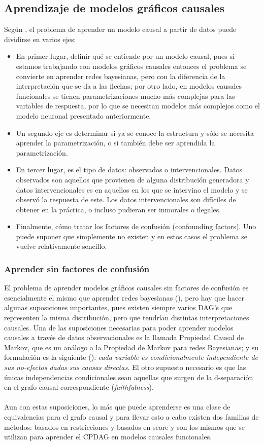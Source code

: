 \documentclass[11pt]{article}
\theoremstyle{plain}
\begin{document}
\subsection{Aprendizaje de modelos gráficos causales}
Según \cite{koller2009probabilistic}, el problema de aprender un modelo causal a partir de datos puede dividirse en varios ejes:
\begin{itemize}
\item En primer lugar, definir qué se entiende por un modelo causal, pues si estamos trabajando con modelos gráficos causales entonces el problema se convierte en aprender redes bayesianas, pero con la diferencia de la interpretación que se da a las flechas; por otro lado, en modelos causales funcionales se tienen parametrizaciones mucho más complejas para las variables de respuesta, por lo que se necesitan modelos más complejos como el modelo neuronal presentado anteriormente.
\item Un segundo eje es determinar si ya se conoce la estructura y sólo se necesita aprender la parametrización, o si también debe ser aprendida la parametrización.
\item En tercer lugar, es el tipo de datos: observados o intervencionales. Datos observados son aquellos que provienen de alguna distribución generadora y datos intervencionales es en aquellos en los que se intervino el modelo y se observó la respuesta de este. Los datos intervencionales son difíciles de obtener en la práctica, o incluso pudieran ser inmorales o ilegales.
\item Finalmente, cómo tratar los factores de confusión (confounding factors). Uno puede suponer que simplemente no existen y en estos casos el problema se vuelve relativamente sencillo.
\end{itemize}
\subsubsection{Aprender sin factores de confusión}
El problema de aprender modelos gráficos causales sin factores de confusión es esencialmente el mismo que aprender redes bayesianas (\cite{koller2009probabilistic}), pero hay que hacer algunas suposiciones importantes, pues existen siempre varios DAG's que representen la misma distribución, pero que tendrían distintas interpretaciones causales. Una de las suposiciones necesarias para poder aprender modelos causales a través de datos observacionales es la llamada Propiedad Causal de Markov, que es un análogo a la Propiedad de Markov para redes Bayesianas; y su formulación es la siguiente (\cite{koller2009probabilistic}): \textit{cada variable es condicionalmente independiente de sus no-efectos dadas sus causas directas.} El otro supuesto necesario es que las únicas independencias condicionales sean aquellas que surgen de la d-separación en el grafo causal correspondiente (\textit{faithfulness}).\\
\\
Aun con estas suposiciones, lo más que puede aprenderse es una clase de equivalencias para el grafo causal y para llevar esto a cabo existen dos familias de métodos: basados en restricciones y basados en score y son los mismos que se utilizan para aprender el CPDAG en modelos causales funcionales.
\end{document}
